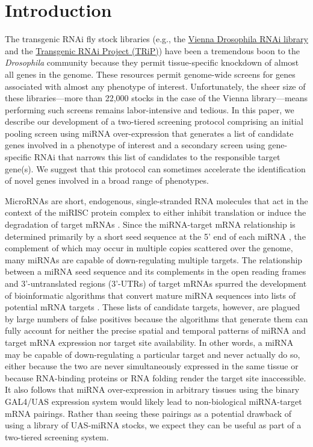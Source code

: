 \section*{Introduction}

The transgenic RNAi fly stock libraries (e.g., the \href{http://stockcenter.vdrc.at/control/rnailibrary}{Vienna Drosophila RNAi library} \cite{Oppel_Scheiblauer_et_al__2007} and the \href{http://www.flyrnai.org/TRiP-HOME.html}{Transgenic RNAi Project (TRiP)}) have been a tremendous boon to the \emph{Drosophila} community because they permit tissue-specific knockdown of almost all genes in the genome.
These resources permit genome-wide screens for genes associated with almost any phenotype of interest.
Unfortunately, the sheer size of these libraries---more than 22,000 stocks in the case of the Vienna library---means performing such screens remains labor-intensive and tedious.
In this paper, we describe our development of a two-tiered screening protocol comprising an initial pooling screen using miRNA over-expression that generates a list of candidate genes involved in a phenotype of interest and a secondary screen using gene-specific RNAi that narrows this list of candidates to the responsible target gene(s).
We suggest that this protocol can sometimes accelerate the identification of novel genes involved in a broad range of phenotypes.

MicroRNAs are short, endogenous, single-stranded RNA molecules that act in the context of the miRISC protein complex to either inhibit translation or induce the degradation of target mRNAs \cite{BARTEL_2004}.
Since the miRNA-target mRNA relationship is determined primarily by a short seed sequence at the 5' end of each miRNA \cite{ones-Rhoades_Bartel_Burge_2003,Lai_2002}, the complement of which may occur in multiple copies scattered over the genome, many miRNAs are capable of down-regulating multiple targets.
The relationship between a miRNA seed sequence and its complements in the open reading frames and 3'-untranslated regions (3'-UTRs) of target mRNAs spurred the development of bioinformatic algorithms that convert mature miRNA sequences into lists of potential mRNA targets \cite{Rajewsky_2006}.
These lists of candidate targets, however, are plagued by large numbers of false positives because the algorithms that generate them can fully account for neither the precise spatial and temporal patterns of miRNA and target mRNA expression nor target site availability.
In other words, a miRNA may be capable of down-regulating a particular target and never actually do so, either because the two are never simultaneously expressed in the same tissue or because RNA-binding proteins or RNA folding render the target site inaccessible.
It also follows that miRNA over-expression in arbitrary tissues using the binary GAL4/UAS expression system would likely lead to non-biological miRNA-target mRNA pairings.
Rather than seeing these pairings as a potential drawback of using a library of UAS-miRNA stocks, we expect they can be useful as part of a two-tiered screening system.

